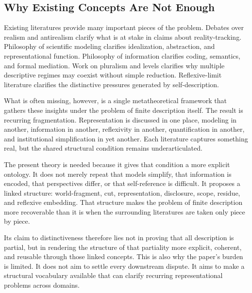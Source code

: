 \documentclass[11pt]{article}
\begin{document}
\subsection{Why Existing Concepts Are Not Enough}

Existing literatures provide many important pieces of the problem. Debates over realism and antirealism clarify what is at stake in claims about reality-tracking. Philosophy of scientific modeling clarifies idealization, abstraction, and representational function. Philosophy of information clarifies coding, semantics, and formal mediation. Work on pluralism and levels clarifies why multiple descriptive regimes may coexist without simple reduction. Reflexive-limit literature clarifies the distinctive pressures generated by self-description. \cite{chakravartty_scientific_realism_sep,frigg_hartmann_models_sep,frigg_nguyen_scientific_representation_sep,adriaans_information_sep,scientific_pluralism_sep,levels_org_biology_sep,bolander_self_reference_sep}

What is often missing, however, is a single metatheoretical framework that gathers these insights under the problem of finite description itself. The result is recurring fragmentation. Representation is discussed in one place, modeling in another, information in another, reflexivity in another, quantification in another, and institutional simplification in yet another. Each literature captures something real, but the shared structural condition remains underarticulated. \cite{frigg_nguyen_scientific_representation_sep,espeland_stevens_quantification,bowker_star_sorting_things_out}

The present theory is needed because it gives that condition a more explicit ontology. It does not merely repeat that models simplify, that information is encoded, that perspectives differ, or that self-reference is difficult. It proposes a linked structure: world-fragment, cut, representation, disclosure, scope, residue, and reflexive embedding. That structure makes the problem of finite description more recoverable than it is when the surrounding literatures are taken only piece by piece.

Its claim to distinctiveness therefore lies not in proving that all description is partial, but in rendering the structure of that partiality more explicit, coherent, and reusable through those linked concepts. This is also why the paper's burden is limited. It does not aim to settle every downstream dispute. It aims to make a structural vocabulary available that can clarify recurring representational problems across domains.
\end{document}

